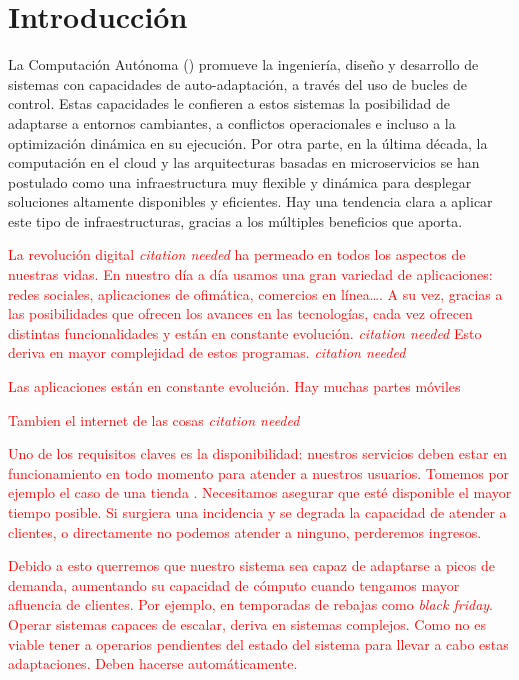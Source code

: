 
\chapter{Introducción}
\label{chap:introduccion}

La Computación Autónoma () promueve la ingeniería, diseño y desarrollo de sistemas con capacidades de auto-adaptación, a través del uso de bucles de control. Estas capacidades le confieren a estos sistemas la posibilidad de adaptarse a entornos cambiantes, a conflictos operacionales e incluso a la optimización dinámica en su ejecución. Por otra parte, en la última década, la computación en el cloud y las arquitecturas basadas en microservicios se han postulado como una infraestructura muy flexible y dinámica para desplegar soluciones altamente disponibles y eficientes. Hay una tendencia clara a aplicar este tipo de infraestructuras, gracias a los múltiples beneficios que aporta.

\textcolor{red}{La revolución digital \emph{citation needed} ha permeado en todos los aspectos de nuestras vidas. En nuestro día a día usamos una gran variedad de aplicaciones: redes sociales, aplicaciones de ofimática, comercios en línea\dots. A su vez, gracias a las posibilidades que ofrecen los avances en las tecnologías, cada vez ofrecen distintas funcionalidades y están en constante evolución. \emph{citation needed} Esto deriva en mayor complejidad de estos programas. \emph{citation needed}}

\textcolor{red}{Las aplicaciones están en constante evolución. Hay muchas partes móviles}

\textcolor{red}{Tambien el internet de las cosas \emph{citation needed}}

\textcolor{red}{Uno de los requisitos claves es la disponibilidad: nuestros servicios deben estar en funcionamiento en todo momento para atender a nuestros usuarios. Tomemos por ejemplo el caso de una tienda . Necesitamos asegurar que esté disponible el mayor tiempo posible. Si surgiera una incidencia y se degrada la capacidad de atender a clientes, o directamente no podemos atender a ninguno, perderemos ingresos.}

\textcolor{red}{Debido a esto querremos que nuestro sistema sea capaz de adaptarse a picos de demanda, aumentando su capacidad de cómputo cuando tengamos mayor afluencia de clientes. Por ejemplo, en temporadas de rebajas como \emph{black friday}. Operar sistemas capaces de escalar, deriva en sistemas complejos. Como no es viable tener a operarios pendientes del estado del sistema para llevar a cabo estas adaptaciones. Deben hacerse automáticamente.}

